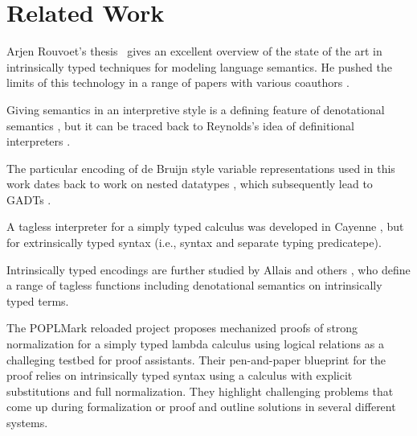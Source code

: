 \documentclass[sigplan,anonymous,review,screen]{acmart}
\begin{document}


\section{Related Work}
\label{sec:related-work}

Arjen Rouvoet's thesis~\cite{DBLP:phd/basesearch/Rouvoet21} gives an
excellent overview of the state of the art in intrinsically typed
techniques for modeling language semantics. He pushed the limits of
this technology in a range of papers with various coauthors
\cite{DBLP:journals/pacmpl/RestPRVM22,DBLP:journals/pacmpl/RouvoetKV21,DBLP:conf/cpp/RouvoetPKV20,DBLP:journals/pacmpl/PoulsenRTKV18}. 

Giving semantics in an interpretive style is a defining feature of
denotational semantics \cite{Schmidt1986}, but it can be traced back
to Reynolds's idea of definitional interpreters \cite{Reynolds1975}.

The particular encoding of de Bruijn style variable representations
used in this work dates back to work on nested datatypes
\cite{DBLP:conf/mpc/BirdM98,DBLP:journals/jfp/BirdP99,DBLP:conf/csl/AltenkirchR99},
which subsequently lead to GADTs
\cite{cheney03:_first_class_phant_types}.

A tagless interpreter for a simply typed calculus was developed in
Cayenne \cite{augustsson99}, but for extrinsically typed syntax (i.e.,
syntax and separate typing predicatepe).

Intrinsically typed encodings are further studied by Allais and others
\cite{DBLP:conf/cpp/Allais0MM17}, who define a range of tagless
functions including denotational semantics on intrinsically typed
terms. 

The POPLMark reloaded project \cite{DBLP:journals/jfp/AbelAHPMSS19} proposes
mechanized proofs of strong normalization for a simply typed lambda
calculus using logical relations as a challeging testbed for proof
assistants. Their pen-and-paper blueprint for the proof relies on
intrinsically typed syntax using a calculus with explicit
substitutions and full normalization. They highlight challenging
problems that come up during formalization or proof and outline
solutions in several different systems. 
\end{document}
